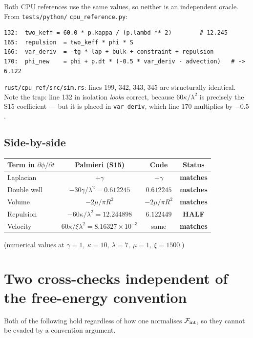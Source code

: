 \documentclass[11pt]{article}
\newcommand{\OK}{{\color{blue}\textbf{matches}}}
\newcommand{\BAD}{{\color{red}\textbf{HALF}}}
\begin{document}
Both CPU references use the same values, so neither is an independent oracle.
From \texttt{tests/python/} \texttt{cpu\_reference.py}:
\begin{lstlisting}
132:  two_keff = 60.0 * p.kappa / (p.lambd ** 2)        # 12.245
165:  repulsion  = two_keff * phi * S
166:  var_deriv  = -tg * lap + bulk + constraint + repulsion
170:  phi_new    = phi + p.dt * (-0.5 * var_deriv - advection)   # -> 6.122
\end{lstlisting}
\texttt{rust/cpu\_ref/src/sim.rs}: lines 199, 342, 343, 345 are structurally
identical. Note the trap: line 132 in isolation \emph{looks} correct, because
$60\kappa/\lambda^2$ is precisely the S15 coefficient --- but it is placed in
\texttt{var\_deriv}, which line 170 multiplies by $-0.5$.

\subsection{Side-by-side}

\begin{center}\small
\begin{tabular}{lccc}
\toprule
Term in $\partial\phi/\partial t$ & Palmieri (S15) & Code & Status \\
\midrule
Laplacian     & $+\gamma$                  & $+\gamma$                  & \OK \\
Double well   & $-30\gamma/\lambda^2 = 0.612245$ & $0.612245$ & \OK \\
Volume        & $-2\mu/\pi R^2$            & $-2\mu/\pi R^2$            & \OK \\
Repulsion     & $-60\kappa/\lambda^2 = 12.244898$ & $6.122449$ & \BAD \\
Velocity      & $60\kappa/\xi\lambda^2 = 8.16327\times10^{-3}$ & same & \OK \\
\bottomrule
\end{tabular}
\end{center}
(numerical values at $\gamma=1,\ \kappa=10,\ \lambda=7,\ \mu=1,\ \xi=1500$.)

\section{Two cross-checks independent of the free-energy convention}
\label{sec:crosschecks}

Both of the following hold regardless of how one normalises
$\mathcal{F}_{\rm int}$, so they cannot be evaded by a convention argument.
\end{document}
